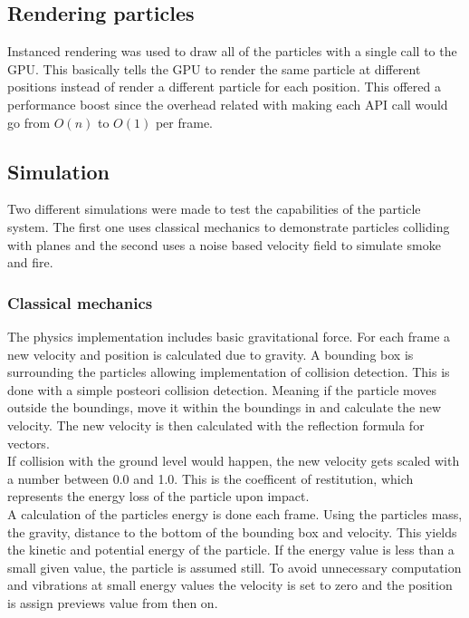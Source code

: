 \documentclass[report]{vgtc}
\begin{document}
	\subsection{Rendering particles}
Instanced rendering was used to draw all of the particles with a single call to the GPU. This basically tells the GPU to render the same particle at different positions instead of render a different particle for each position. This offered a performance boost since the overhead related with making each API call would go from \(O(n)\) to \(O(1)\) per frame. 




	\subsection{Simulation}
Two different simulations were made to test the capabilities of the particle system. The first one uses classical mechanics to demonstrate particles colliding with planes and the second uses a noise based velocity field to simulate smoke and fire. 


	\subsubsection{Classical mechanics}

The physics implementation includes basic gravitational force. For each frame a new velocity and position is calculated due to gravity. 
A bounding box is surrounding the particles allowing implementation of collision detection. This is done with a simple posteori collision detection. Meaning if the particle moves outside the boundings, move it within the boundings in and calculate the new velocity. The new velocity is then calculated with the reflection formula for vectors.\\
If collision with the ground level would happen, the new velocity gets scaled with a number between 0.0 and 1.0. This is the coefficent of restitution, which represents the energy loss of the particle upon impact.\\
A calculation of the particles energy is done each frame. Using the particles mass, the gravity, distance to the bottom of the bounding box and velocity. This yields the kinetic and potential energy of the particle. If the energy value is less than a small given value, the particle is assumed still. To avoid unnecessary computation and vibrations at small energy values the velocity is set to zero and the position is assign previews value from then on.
\end{document}
